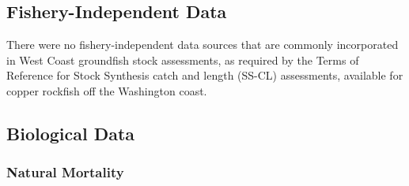 \documentclass[11pt,
  english,
  a4paper,
]{article}
\begin{document}
\hypertarget{fishery-independent-data}{%
\subsection{Fishery-Independent Data}\label{fishery-independent-data}}

\leavevmode\tagmcend\tagstructend


There were no fishery-independent data sources that are commonly incorporated in West Coast groundfish stock assessments, as required by the Terms of Reference for Stock Synthesis catch and length (SS-CL) assessments, available for copper rockfish off the Washington coast.

\leavevmode\tagmcend\tagstructend\par


\hypertarget{biological-data}{%
\subsection{Biological Data}\label{biological-data}}

\leavevmode\tagmcend\tagstructend


\hypertarget{natural-mortality}{%
\subsubsection{Natural Mortality}\label{natural-mortality}}

\leavevmode\tagmcend\tagstructend

\end{document}

